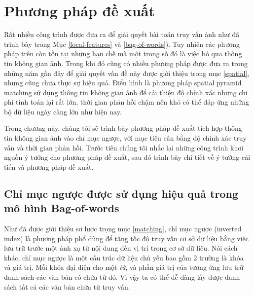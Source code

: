 \chapter{Phương pháp đề xuất}
\label{chapter:proposed}
\ifpdf
    \graphicspath{{Chapter3/Chapter3Figs/PNG/}{Chapter3/Chapter3Figs/PDF/}{Chapter3/Chapter3Figs/}}
\else
    \graphicspath{{Chapter3/Chapter3Figs/EPS/}{Chapter3/Chapter3Figs/}}
\fi


Rất nhiều công trình được đưa ra để giải quyết bài toán truy vấn ảnh như đã trình bày trong Mục \ref{local-features} và \ref{bag-of-words}). Tuy nhiên các phương pháp trên còn tồn tại những hạn chế mà một trong số đó là việc bỏ qua thông tin không gian ảnh. Trong khi đó cũng có nhiều phương pháp được đưa ra trong những năm gần đây để giải quyết vấn đề này được giới thiệu trong mục \ref{spatial}, nhưng cũng chưa thực sự hiệu quả. Điển hình là phương pháp spatial pyramid matching\cite{lazebnik2006beyond} sử dụng thông tin không gian ảnh để cải thiện độ chính xác nhưng chi phí tính toán lại rất lớn, thời gian phản hồi chậm nên khó có thể đáp ứng những bộ dữ liệu ngày càng lớn như hiện nay.

Trong chương này, chúng tôi sẽ trình bày phương pháp đề xuất tích hợp thông tin không gian ảnh vào chỉ mục ngược, với mục tiêu cân bằng độ chính xác truy vấn và thời gian phản hồi. Trước tiên chúng tôi nhắc lại những công trình khơi nguồn ý tưởng cho phương pháp đề xuất, sau đó trình bày chi tiết về ý tưởng cải tiến và phương pháp đề xuất.

\section{Chỉ mục ngược được sử dụng hiệu quả trong mô hình Bag-of-words}
\label{sec:inverted-index}
Như đã được giới thiệu sơ lược trọng mục \ref{matching}, chỉ mục ngược (inverted index) là phương pháp phổ dùng để tăng tốc độ truy vấn cơ sở dữ liệu bằng việc lưu trữ trước một ánh xạ từ nội dung đến vị trí trong cơ sở dữ liêu. Nói cách khác, chỉ mục ngược là một cấu trúc dữ liệu chủ yếu bao gồm 2 trường là khóa và giá trị. Mỗi khóa đại diện cho một \textit{từ}, và phần giá trị của tương ứng lưu trữ danh sách các văn bản có chứa từ đó. Vì vậy ta có thể dễ dàng lấy được danh sách tất cả các văn bản chứa từ truy vấn.

